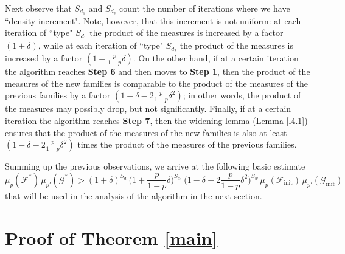 \documentclass[10pt]{amsart}
\theoremstyle{remark}
\newcommand{\Fcal}{\mathcal{F}}
\newcommand{\Gcal}{\mathcal{G}}
\begin{document}
Next observe that $S_{d_1}$ and $S_{d_2}$ count the number of iterations where we have ``density increment"\!.
Note, however, that this increment is not uniform: at each iteration of ``type" $S_{d_1}$
the product of the measures is increased by a factor $(1+\delta)$, while at each iteration of ``type" $S_{d_2}$
the product of the measures is increased by a factor $(1+\frac{p}{1-p}\delta)$. On the other hand, if at a certain
iteration the algorithm reaches \textbf{Step 6} and then moves to \textbf{Step 1}, then the product of the measures
of the new families is comparable to the product of the measures of the previous families by a factor
$(1-\delta-2\frac{p}{1-p}\delta^2)$; in other words, the product of the measures may possibly drop,
but not significantly. Finally,  if at a certain iteration the algorithm reaches \textbf{Step 7},
then the widening lemma (Lemma \ref{l4.1}) ensures that the product of the measures
of the new families is also at least $(1-\delta-2\frac{p}{1-p}\delta^2)$ times
the product of the measures of the previous families.

Summing up the previous observations, we arrive at the following basic estimate
\begin{equation} \label{e5.7}
\mu_p(\Fcal^*)\,\mu_{p'}(\Gcal^*) > (1+\delta)^{S_{d_1}} \Big(1+\frac{p}{1-p}\delta\Big)^{S_{d_2}}\,
\Big(1-\delta-2\frac{p}{1-p}\delta^2\Big)^{S_w}\, \mu_p(\Fcal_{\mathrm{init}})\, \mu_{p'}(\Gcal_{\mathrm{init}})
\end{equation}
that will be used in the analysis of the algorithm in the next section.


\section{Proof of Theorem \ref*{main}} \label{sec6}

\end{document}
